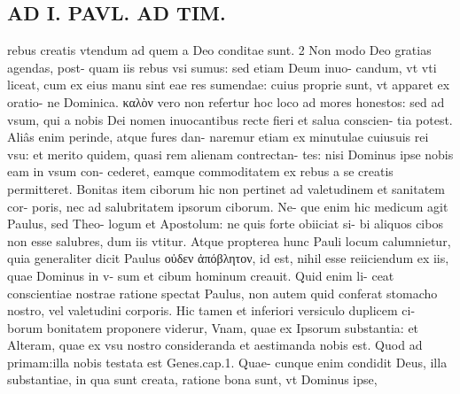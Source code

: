 \documentclass{article}
\begin{document}
\begin{pages}
\section*{AD I. PAVL. AD TIM. }
\marginpar{[ p.196 ]}\pstart rebus creatis vtendum ad quem a Deo conditae sunt. 2 Non modo Deo gratias agendas, post- quam iis rebus vsi sumus: sed etiam Deum inuo- candum, vt vti liceat, cum ex eius manu sint eae res sumendae: cuius proprie sunt, vt apparet ex oratio- ne Dominica. καλὸν vero non refertur hoc loco ad mores honestos: sed ad vsum, qui a nobis Dei nomen inuocantibus recte fieri et salua conscien- tia potest. Aliâs enim perinde, atque fures dan- naremur etiam ex minutulae cuiusuis rei vsu: et merito quidem, quasi rem alienam contrectan- tes: nisi Dominus ipse nobis eam in vsum con- cederet, eamque commoditatem ex rebus a se creatis permitteret. Bonitas item ciborum hic non pertinet ad valetudinem et sanitatem cor- poris, nec ad salubritatem ipsorum ciborum. Ne- que enim hic medicum agit Paulus, sed Theo- logum et Apostolum: ne quis forte obiiciat si- bi aliquos cibos non esse salubres, dum iis vtitur. Atque propterea hunc Pauli locum calumnietur, quia generaliter dicit Paulus οὐδεν ἀπόβλητον, id est, nihil esse reiiciendum ex iis, quae Dominus in v- sum et cibum hominum creauit. Quid enim li- ceat conscientiae nostrae ratione spectat Paulus, non autem quid conferat stomacho nostro, vel valetudini corporis. Hic tamen et inferiori versiculo duplicem ci- borum bonitatem proponere viderur, Vnam, quae ex Ipsorum substantia: et Alteram, quae ex vsu nostro consideranda et aestimanda nobis est. Quod ad primam:illa nobis testata est Genes.cap.1. Quae- cunque enim condidit Deus, illa substantiae, in qua sunt creata, ratione bona sunt, vt Dominus ipse,  \pend

\end{pages}
\end{document}
